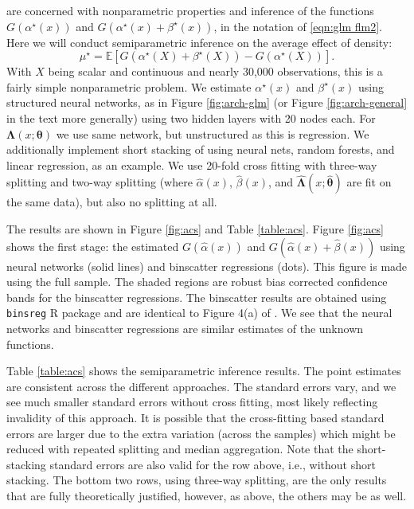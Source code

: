 \documentclass[12pt]{article}
\numberwithin{equation}{section}
\theoremstyle{definition}
\newcommand{\E}{\mathbb{E}}
\newcommand{\btheta}{\boldsymbol{\theta}}
\newcommand{\bL}{\boldsymbol{\Lambda}}
\newcommand{\mtrue}{\mu^\star}
\newcommand{\atrue}{\alpha^\star}
\newcommand{\btrue}{\beta^\star}
\newcommand{\bthat}{\bm{\widehat{\theta}}}
\newcommand{\ahat}{\widehat{\alpha}}
\newcommand{\bhat}{\widehat{\beta}}
\newcommand{\bLhat}{\widehat{\bL}}
\begin{document}
\begin{appendices}
\cite{Cattaneo-Crump-Farrell-Feng2024_WP} are concerned with nonparametric properties and inference of the functions $G(\atrue(x))$ and $G(\atrue(x) + \btrue(x))$, in the notation of \eqref{eqn:glm flm2}. Here we will conduct semiparametric inference on the average effect of density:
\[
    \mtrue = \E[G(\atrue(X) + \btrue(X)) - G(\atrue(X))].
\]
With $X$ being scalar and continuous and nearly 30,000 observations, this is a fairly simple nonparametric problem. We estimate $\atrue(x)$ and $\btrue(x)$ using structured neural networks, as in Figure \ref{fig:arch-glm} (or Figure \ref{fig:arch-general} in the text more generally) using two hidden layers with 20 nodes each. For $\bL(x; \btheta)$ we use same network, but unstructured as this is regression. We additionally implement short stacking of \cite{Ahrens-Hansen-Schaffer-Wiemann2025_JAE} using neural nets, random forests, and linear regression, as an example. We use 20-fold cross fitting with three-way splitting and two-way splitting (where $\ahat(x)$, $\bhat(x)$, and $\bLhat(x; \bthat)$ are fit on the same data), but also no splitting at all. 

The results are shown in Figure \ref{fig:acs} and Table \ref{table:acs}. Figure \ref{fig:acs} shows the first stage: the estimated $G(\ahat(x))$ and $G(\ahat(x) + \bhat(x))$ using neural networks (solid lines) and binscatter regressions (dots). This figure is made using the full sample. The shaded regions are robust bias corrected confidence bands for the binscatter regressions. The binscatter results are obtained using {\tt binsreg} {\sf R} package \citep{Cattaneo-Crump-Farrell-Feng2025_Stata} and are identical to Figure 4(a) of \cite{Cattaneo-Crump-Farrell-Feng2024_WP}. We see that the neural networks and binscatter regressions are similar estimates of the unknown functions. 

Table \ref{table:acs} shows the semiparametric inference results. The point estimates are consistent across the different approaches. The standard errors vary, and we see much smaller standard errors without cross fitting, most likely reflecting invalidity of this approach. It is possible that the cross-fitting based standard errors are larger due to the extra variation (across the samples) which might be reduced with repeated splitting and median aggregation. Note that the short-stacking standard errors are also valid for the row above, i.e., without short stacking. The bottom two rows, using three-way splitting, are the only results that are fully theoretically justified, however, as above, the others may be as well. 




\end{appendices}
\end{document}
